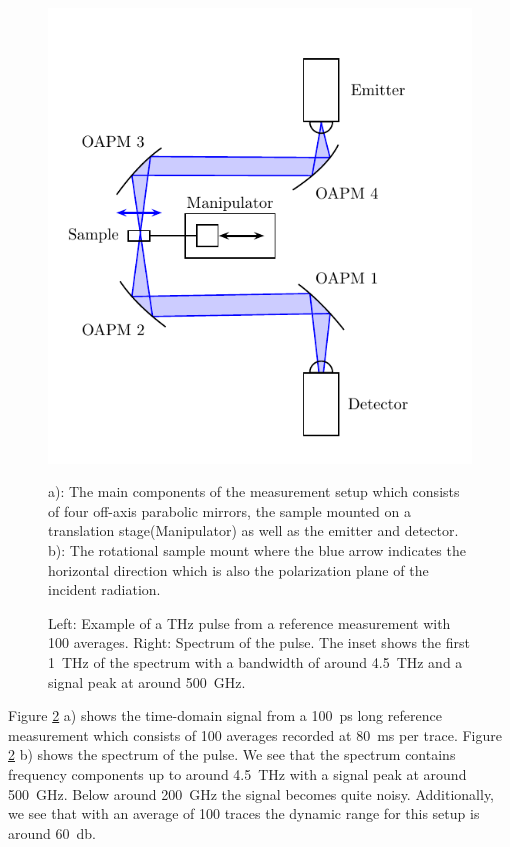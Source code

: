 \begin{figure}[H]
    \centering
    \subcaptionbox{\label{fig:1}}
        {\hspace*{-2em}\includegraphics[width=0.45\linewidth]{images/3_chapter03/Setup-THz-TDS-HHI.pdf}}
    \qquad
    \subcaptionbox{\label{fig:2}}
        {\hspace*{-2em}}
    
    \caption{a): The main components of the measurement setup which consists of four off-axis parabolic mirrors, the sample mounted on a translation stage(Manipulator) as well as the emitter and detector. b): The rotational sample mount where the blue arrow indicates the horizontal direction which is also the polarization plane of the incident radiation.}
    \label{fig:3_THz-TDS-HHI}
\end{figure}

\begin{figure}[H]
    \centering
    
    \caption{Left: Example of a THz pulse from a reference measurement with 100 averages. Right: Spectrum of the pulse. The inset shows the first \SI{1}{\tera \hertz} of the spectrum with a bandwidth of around \SI{4.5}{\tera \hertz} and a signal peak at around \SI{500}{\giga \hertz}.}
    \label{fig:HHI_pulse_example}
\end{figure}

Figure \ref{fig:HHI_pulse_example} a) shows the time-domain signal from a \SI{100}{\pico \second} long reference measurement which consists of 100 averages recorded at \SI{80}{\milli \second} per trace. Figure \ref{fig:HHI_pulse_example} b) shows the spectrum of the pulse. We see that the spectrum contains frequency components up to around \SI{4.5}{\tera \hertz} with a signal peak at around \SI{500}{\giga \hertz}. Below around \SI{200}{\giga \hertz} the signal becomes quite noisy. Additionally, we see that with an average of 100 traces the dynamic range for this setup is around \SI{60}{\decibel}.


